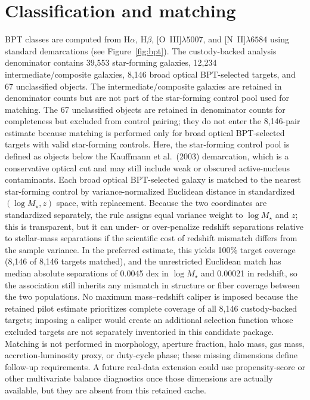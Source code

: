\documentclass[twocolumn]{aastex631}
\begin{document}
\section{Classification and matching}
BPT classes are computed from H$\alpha$, H$\beta$, [O~III]$\lambda5007$, and [N~II]$\lambda6584$ using standard demarcations \citep{baldwin1981,kewley2001,kauffmann2003bpt,kewley2006} (see Figure~\ref{fig:bpt}). The custody-backed analysis denominator contains 39,553 star-forming galaxies, 12,234 intermediate/composite galaxies, 8,146 broad optical BPT-selected targets, and 67 unclassified objects. The intermediate/composite galaxies are retained in denominator counts but are not part of the star-forming control pool used for matching. The 67 unclassified objects are retained in denominator counts for completeness but excluded from control pairing; they do not enter the 8,146-pair estimate because matching is performed only for broad optical BPT-selected targets with valid star-forming controls. Here, the star-forming control pool is defined as objects below the Kauffmann et al.\ (2003) demarcation, which is a conservative optical cut and may still include weak or obscured active-nucleus contaminants. Each broad optical BPT-selected galaxy is matched to the nearest star-forming control by variance-normalized Euclidean distance in standardized $(\log M_\star,z)$ space, with replacement. Because the two coordinates are standardized separately, the rule assigns equal variance weight to $\log M_\star$ and \(z\); this is transparent, but it can under- or over-penalize redshift separations relative to stellar-mass separations if the scientific cost of redshift mismatch differs from the sample variance. In the preferred estimate, this yields 100\% target coverage (8,146 of 8,146 targets matched), and the unrestricted Euclidean match has median absolute separations of 0.0045 dex in $\log M_\star$ and 0.00021 in redshift, so the association still inherits any mismatch in structure or fiber coverage between the two populations. No maximum mass--redshift caliper is imposed because the retained pilot estimate prioritizes complete coverage of all 8,146 custody-backed targets; imposing a caliper would create an additional selection function whose excluded targets are not separately inventoried in this candidate package. Matching is not performed in morphology, aperture fraction, halo mass, gas mass, accretion-luminosity proxy, or duty-cycle phase; these missing dimensions define follow-up requirements. A future real-data extension could use propensity-score or other multivariate balance diagnostics once those dimensions are actually available, but they are absent from this retained cache.
\end{document}
